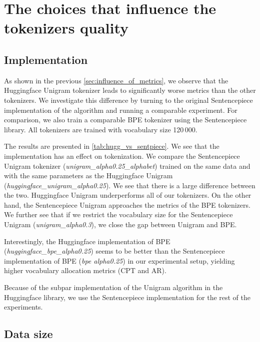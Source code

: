 
\section{The choices that influence the tokenizers quality}

\subsection{Implementation}
\label{sec:implementation}



As shown in the previous \autoref{sec:influence_of_metrics}, we observe that the Huggingface Unigram tokenizer leads to significantly worse metrics than the other tokenizers. We investigate this difference by turning to the original Sentencepiece implementation of the algorithm and running a comparable experiment. For comparison, we also train a comparable BPE tokenizer using the Sentencepiece library. All tokenizers are trained with vocabulary size 120\,000.

The results are presented in \autoref{tab:hugg_vs_sentpiece}. We see that the implementation has an effect on tokenization. We compare the Sentencepiece Unigram tokenizer (\textit{unigram\_alpha0.25\_alphabet}) trained on the same data and with the same parameters as the Huggingface Unigram (\textit{huggingface\_unigram\_alpha0.25}). We see that there is a large difference between the two. Huggingface Unigram underperforms all of our tokenizers. On the other hand, the Sentencepiece Unigram approaches the metrics of the BPE tokenizers. We further see that if we restrict the vocabulary size for the Sentencepiece Unigram (\textit{unigram\_alpha0.3}), we close the gap between Unigram and BPE. 

Interestingly, the Huggingface implementation of BPE (\textit{huggingface\_bpe\_alpha0.25}) seems to be better than the Sentencepiece implementation of BPE (\textit{bpe alpha0.25}) in our experimental setup, yielding higher vocabulary allocation metrics (CPT and AR).

Because of the subpar implementation of the Unigram algorithm in the Huggingface library, we use the Sentencepiece implementation for the rest of the experiments.

\subsection{Data size}
\label{sec:data_size}

